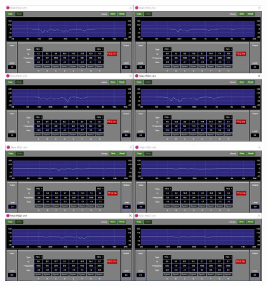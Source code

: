 \documentclass[11pt,a4j]{jreport}
\begin{document}
\begin{figure}[H]
  \begin{minipage}[b]{.5\linewidth}
    \centering
    \includegraphics[width=.9\linewidth]{images/experimentField/afcParameters/base02autoEQ1.jpg}
  \end{minipage}%
  \begin{minipage}[b]{.5\linewidth}
    \centering
    \includegraphics[width=.9\linewidth]{images/experimentField/afcParameters/base02autoEQ2.jpg}
  \end{minipage}


\end{figure}
\end{document}

